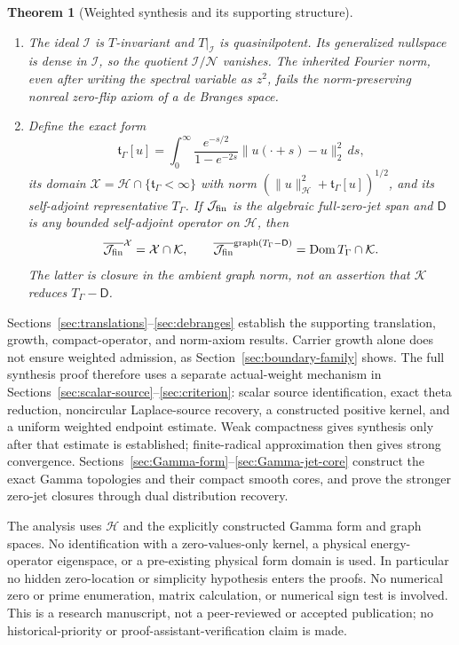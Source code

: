 \documentclass[11pt,a4paper]{article}
\numberwithin{equation}{section}
\newtheorem{theorem}{Theorem}[section]
\theoremstyle{definition}
\theoremstyle{remark}
\newcommand{\Hh}{\mathcal H}
\newcommand{\Nn}{\mathcal N}
\newcommand{\Ii}{\mathcal I}
\newcommand{\Kk}{\mathcal K}
\newcommand{\norm}[1]{\lVert #1\rVert}
\begin{document}
\begin{theorem}[Weighted synthesis and its supporting structure]
\begin{enumerate}
 \item The ideal $\Ii$ is $T$-invariant and $T|_{\Ii}$ is quasinilpotent. Its generalized nullspace is dense in $\Ii$, so the quotient $\Ii/\Nn$ vanishes. The inherited Fourier norm, even after writing the spectral variable as $z^2$, fails the norm-preserving nonreal zero-flip axiom of a de Branges space.
 \item Define the exact form
 \[
 \mathfrak t_\Gamma[u]=\int_0^\infty\frac{e^{-s/2}}{1-e^{-2s}}
             \norm{u(\cdot+s)-u}_2^2\,ds,
 \]
 its domain $\mathcal X=\Hh\cap\{\mathfrak t_\Gamma<\infty\}$ with norm
 $(\norm{u}_{\Hh}^2+\mathfrak t_\Gamma[u])^{1/2}$, and its self-adjoint representative $T_\Gamma$. If $\mathcal J_{\rm fin}$ is the algebraic full-zero-jet span and $\mathsf D$ is any bounded self-adjoint operator on $\Hh$, then
 \[
 \overline{\mathcal J_{\rm fin}}^{\mathcal X}=\mathcal X\cap\Kk,
 \qquad
 \overline{\mathcal J_{\rm fin}}^{\operatorname{graph}(T_\Gamma-\mathsf D)}
       =\operatorname{Dom}T_\Gamma\cap\Kk.
 \]
 The latter is closure in the ambient graph norm, not an assertion that $\Kk$ reduces $T_\Gamma-\mathsf D$.
\end{enumerate}
\end{theorem}

Sections~\ref{sec:translations}--\ref{sec:debranges} establish the supporting translation, growth, compact-operator, and norm-axiom results. Carrier growth alone does not ensure weighted admission, as Section~\ref{sec:boundary-family} shows. The full synthesis proof therefore uses a separate actual-weight mechanism in Sections~\ref{sec:scalar-source}--\ref{sec:criterion}: scalar source identification, exact theta reduction, noncircular Laplace-source recovery, a constructed positive kernel, and a uniform weighted endpoint estimate. Weak compactness gives synthesis only after that estimate is established; finite-radical approximation then gives strong convergence. Sections~\ref{sec:Gamma-form}--\ref{sec:Gamma-jet-core} construct the exact Gamma topologies and their compact smooth cores, and prove the stronger zero-jet closures through dual distribution recovery.

The analysis uses $\Hh$ and the explicitly constructed Gamma form and graph spaces. No identification with a zero-values-only kernel, a physical energy-operator eigenspace, or a pre-existing physical form domain is used. In particular no hidden zero-location or simplicity hypothesis enters the proofs. No numerical zero or prime enumeration, matrix calculation, or numerical sign test is involved. This is a research manuscript, not a peer-reviewed or accepted publication; no historical-priority or proof-assistant-verification claim is made.
\end{document}
